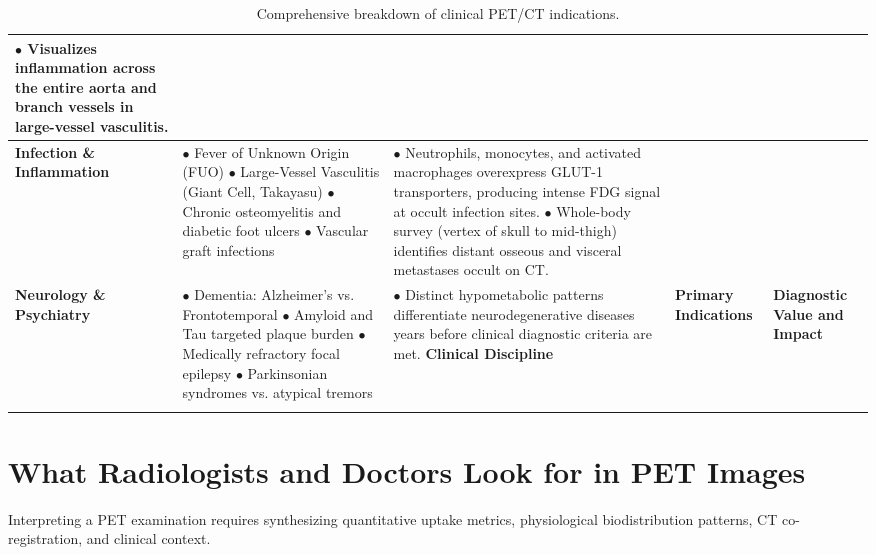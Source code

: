 \documentclass[11pt,a4paper]{article}
\begin{document}
\begin{longtable}{p{3.2cm}p{6cm}p{6cm}}
$\bullet$ Visualizes inflammation across the entire aorta and branch vessels in large-vessel vasculitis. \\
\midrule
\textbf{Infection \& Inflammation} & 
$\bullet$ Fever of Unknown Origin (FUO)\newline
$\bullet$ Large-Vessel Vasculitis (Giant Cell, Takayasu)\newline
$\bullet$ Chronic osteomyelitis and diabetic foot ulcers\newline
$\bullet$ Vascular graft infections & 
$\bullet$ Neutrophils, monocytes, and activated macrophages overexpress GLUT-1 transporters, producing intense FDG signal at occult infection sites.\newline
$\bullet$ Whole-body survey (vertex of skull to mid-thigh) identifies distant osseous and visceral metastases occult on CT. \\
\midrule
\textbf{Neurology \& Psychiatry} & 
$\bullet$ Dementia: Alzheimer's vs. Frontotemporal\newline
$\bullet$ Amyloid and Tau targeted plaque burden\newline
$\bullet$ Medically refractory focal epilepsy\newline
$\bullet$ Parkinsonian syndromes vs. atypical tremors & 
$\bullet$ Distinct hypometabolic patterns differentiate neurodegenerative diseases years before clinical diagnostic criteria are met.\newline
\textbf{Clinical Discipline} & \textbf{Primary Indications} & \textbf{Diagnostic Value and Impact} \\
\bottomrule
\caption{Comprehensive breakdown of clinical PET/CT indications.}
\label{tab:clinical_indications}
\end{longtable}

\section{What Radiologists and Doctors Look for in PET Images}

Interpreting a PET examination requires synthesizing quantitative uptake metrics, physiological biodistribution patterns, CT co-registration, and clinical context.
\end{document}
